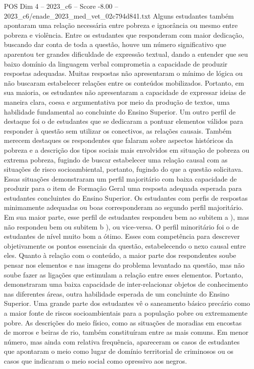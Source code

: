 \begin{textsample}{POS Dim 4 – 2023\_c6 – Score -8.00 – 2023\_c6/enade\_2023\_med\_vet\_02c794d841.txt}
Alguns estudantes também apontaram uma relação necessária entre pobreza e ignorância ou mesmo entre pobreza e violência.
Entre os estudantes que responderam com maior dedicação, buscando dar conta de toda a questão, houve um número significativo que aparentou ter grandes dificuldade de expressão textual, dando a entender que seu baixo domínio da linguagem verbal comprometia a capacidade de produzir respostas adequadas.
Muitas respostas não apresentaram o mínimo de lógica ou não buscaram estabelecer relações entre os conteúdos mobilizados.
Portanto, em sua maioria, os estudantes não apresentaram a capacidade de expressar ideias de maneira clara, coesa e argumentativa por meio da produção de textos, uma habilidade fundamental ao concluinte do Ensino Superior.
Um outro perfil de destaque foi o de estudantes que se dedicaram a pontuar elementos válidos para responder à questão sem utilizar os conectivos, as relações causais.
Também merecem destaques os respondentes que falaram sobre aspectos históricos da pobreza e a descrição dos tipos sociais mais envolvidos em situação de pobreza ou extrema pobreza, fugindo de buscar estabelecer uma relação causal com as situações de risco socioambiental, portanto, fugindo do que a questão solicitava.
Essas situações demonstraram um perfil majoritário com baixa capacidade de produzir para o item de Formação Geral uma resposta adequada esperada para estudantes concluintes do Ensino Superior.
Os estudantes com perfis de respostas minimamente adequadas ou boas corresponderam ao segundo perfil majoritário.
Em sua maior parte, esse perfil de estudantes respondeu bem ao subitem a ), mas não respondeu bem ou subitem b ), ou vice-versa.
O perfil minoritário foi o de estudantes de nível muito bom a ótimo.
Esses com competência para descrever objetivamente os pontos essenciais da questão, estabelecendo o nexo causal entre eles.
Quanto à relação com o conteúdo, a maior parte dos respondentes soube pensar nos elementos e nas imagens do problema levantado na questão, mas não soube fazer as ligações que estimulam a relação entre esses elementos.
Portanto, demonstraram uma baixa capacidade de inter-relacionar objetos de conhecimento nas diferentes áreas, outra habilidade esperada de um concluinte do Ensino Superior.
Uma grande parte dos estudantes vê o saneamento básico precário como a maior fonte de riscos socioambientais para a população pobre ou extremamente pobre.
As descrições do meio físico, como as situações de moradias em encostas de morros e beiras de rio, também constituíram entre as mais comuns.
Em menor número, mas ainda com relativa frequência, apareceram os casos de estudantes que apontaram o meio como lugar de domínio territorial de criminosos ou os casos que indicaram o meio social como opressivo aos negros.

\end{textsample}
